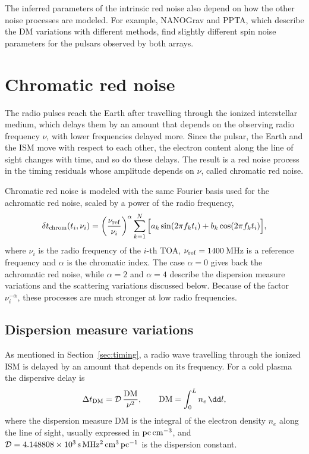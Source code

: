 The inferred parameters of the intrinsic red noise also depend on how the other
noise processes are modeled. For example, NANOGrav and PPTA, which describe the
DM variations with different methods, find slightly different spin noise
parameters for the pulsars observed by both arrays.

\section{Chromatic red noise} \label{sec:chrom}

The radio pulses reach the Earth after travelling through the ionized
interstellar medium, which delays them by an amount that depends on the
observing radio frequency $\nu$, with lower frequencies delayed more. Since the
pulsar, the Earth and the ISM move with respect to each other, the electron
content along the line of sight changes with time, and so do these delays. The
result is a red noise process in the timing residuals whose amplitude depends
on $\nu$, called chromatic red noise.

Chromatic red noise is modeled with the same Fourier basis used for the
achromatic red noise, scaled by a power of the radio frequency,
\begin{equation}
    \delta t_{\rm chrom}(t_i, \nu_i) = \left(\frac{\nu_{\rm ref}}{\nu_i}\right)^{\alpha}
    \sum_{k=1}^{N} \Big[ a_k \sin(2\pi f_k t_i) + b_k \cos(2\pi f_k t_i) \Big],
    \label{eq:chrom}
\end{equation}
where $\nu_i$ is the radio frequency of the $i$-th TOA, $\nu_{\rm ref} =
1400$\,MHz is a reference frequency and $\alpha$ is the chromatic index. The
case $\alpha = 0$ gives back the achromatic red noise, while $\alpha = 2$ and
$\alpha = 4$ describe the dispersion measure variations and the scattering
variations discussed below. Because of the factor $\nu_i^{-\alpha}$, these
processes are much stronger at low radio frequencies.

\subsection{Dispersion measure variations} \label{sec:dm}

As mentioned in Section~\ref{sec:timing}, a radio wave travelling through the
ionized ISM is delayed by an amount that depends on its frequency. For a cold
plasma the dispersive delay is
\begin{equation}
    \Delta t_{\rm DM} = \mathcal{D}\,\frac{\rm DM}{\nu^2},
    \qquad
    {\rm DM} = \int_0^L n_e\,\dd l,
    \label{eq:DM}
\end{equation}
where the dispersion measure DM is the integral of the electron density $n_e$
along the line of sight, usually expressed in ${\rm pc\,cm^{-3}}$, and
$\mathcal{D} = 4.148808\times10^{3}\,{\rm s\,MHz^2\,cm^3\,pc^{-1}}$ is the
dispersion constant.

